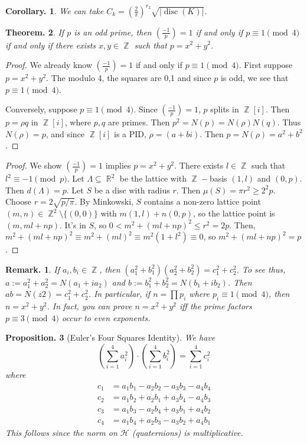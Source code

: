 \documentclass[11pt, a4paper]{memoir}
\DeclareMathOperator{\Z}{{\mathbb{Z}}}
\DeclareMathOperator{\R}{{\mathbb{R}}}
\theoremstyle{change}
\newtheorem{theorem}{Theorem.}[section]
\newtheorem{corollary}[theorem]{Corollary.}
\newtheorem{proposition}[theorem]{Proposition.}
\theoremstyle{plain}
\theoremstyle{nonumberplain}
\newtheorem{remark}{Remark.}
\newtheorem{proof}{Proof}
\DeclareMathOperator{\disc}{disc}
\newcommand{\lgs}[2]{\ensuremath{\left(\frac{#1}{#2}\right)}}
\begin{document}
\begin{corollary}
    We can take $C_k=\left(\frac{2}{\pi}\right)^{r_2}\sqrt{|\disc(K)|}$.
\end{corollary}
\begin{theorem}
    If $p$ is an odd prime, then $\lgs{-1}{p}=1$ if and only if $p\equiv 1\pmod{4}$ if and only if there exists $x,y\in\Z$ such that $p=x^2+y^2$.
\end{theorem}
\begin{proof}
    We already know $\lgs{-1}{p}=1$ if and only if $p\equiv 1\pmod{4}$.
    First suppose $p=x^2+y^2$.
    The modulo 4, the squares are 0,1 and since $p$ is odd, we see that $p\equiv 1\pmod{4}$.

    Conversely, suppose $p\equiv 1\pmod{4}$.
    Since $\lgs{-1}{p}=1$, $p$ splits in $\Z[i]$.
    Then $p=\rho q$ in $\Z[i]$, where $p,q$ are primes.
    Then $p^2=N(p)=N(\rho)N(q)$.
    Thus $N(\rho)=p$, and since $\Z[i]$ is a PID, $\rho=(a+bi)$.
    Then $p=N(\rho)=a^2+b^2$.
\end{proof}
\begin{proof}
    We show $\lgs{-1}{p}=1$ implies $p=x^2+y^2$.
    There exists $l\in\Z$ such that $l^2\equiv -1\pmod{p}$.
    Let $\Lambda\subseteq\R^2$ be the lattice with $\Z-$basis $(1,l)$ and $(0,p)$.
    Then $d(\Lambda)=p$.
    Let $S$ be a disc with radius $r$.
    Then $\mu(S)=\pi r^2\geq 2^2p$.
    Choose $r=2\sqrt{p/\pi}$.
    By Minkowski, $S$ contains a non-zero lattice point $(m,n)\in\Z^2\setminus\{(0,0)\}$ with $m(1,l)+n(0,p)$, so the lattice point is $(m,ml+np)$.
    It's in $S$, so $0<m^2+(ml+np)^2\leq r^2=2p$.
    Then, $m^2+(ml+np)^2\equiv m^2+(ml)^2\equiv m^2(1+l^2)\equiv 0$, so $m^2+(ml+np)^2=p$.
\end{proof}
\begin{remark}
    If $a_i,b_i\in\Z$, then $(a_1^2+b_1^2)(a_2^2+b_2^2)=c_1^2+c_2^2$.
    To see thus, $a:=a_1^2+a_2^2=N(a_1+ia_2)$ and $b:=b_1^2+b_2^2=N(b_1+ib_2)$.
    Then $ab=N(z2)=c_1^2+c_2^2$.
    In particular, if $n=\prod p_i$ where $p_i\equiv 1\pmod{4}$, then $n=x^2+y^2$.
    In fact, you can prove $n=x^2+y^2$ iff the prime factors $p\equiv 3\pmod{4}$ occur to even exponents.
\end{remark}
\begin{proposition}[Euler's Four Squares Identity]
    We have
    \begin{equation*}
        \left(\sum_{i=1}^4 a_i^2\right)\cdot\left(\sum_{i=1}^4 b_i^2\right)=\sum_{i=1}^4 c_i^2
    \end{equation*}
    where
    \begin{align*}
        c_1 &= a_1b_1-a_2b_2-a_3b_3-a_4b_4\\
        c_2 &= a_1b_2+a_2b_1+a_3b_4-a_4b_3\\
        c_3 &= a_1b_3-a_2b_4+a_3b_1+a_4b_2\\
        c_4 &= a_1b_4+a_2b_3-a_3b_2+a_4b_1
    \end{align*}
    This follows since the norm on $\mathcal{H}$ (quaternions) is multiplicative.
\end{proposition}
\end{document}
